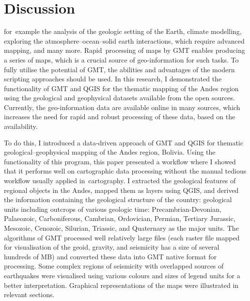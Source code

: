 \documentclass[data,article,accept,pdftex,moreauthors]{Definitions/mdpi}
\begin{document}
\section{Discussion}

 \mbox{for example} the {analysis of the} geologic setting of the Earth, climate modelling, exploring the atmosphere--ocean--solid earth interactions, {which require} advanced mapping, and many more. \linebreak \mbox{Rapid processing} of maps by GMT enables producing a series of maps, which is a crucial source of geo-information for such tasks. To fully utilise the potential of GMT, the abilities and advantages of {the} modern scripting approaches should be used. In this research, I demonstrated the functionality of GMT and QGIS for {the} thematic mapping of the Andes region {using} the geological and geophysical datasets {available from the open sources}. Currently{, the} geo-information data are available online in many sources, which increases the need for rapid and robust processing of these data, based on {the} availability. 

To do this, I introduced a data-driven approach of GMT and QGIS for thematic geological--geophysical mapping of the Andes region, Bolivia. Using the functionality of this program, this paper presented a workflow where I showed that it performs well on cartographic data processing without the manual tedious workflow usually applied \mbox{in cartography}. I extracted the geological features of regional objects in the Andes, mapped them as layers using QGIS, and derived the information containing the geological structure of the country: geological units including outcrops of various geologic time: Precambrian-Devonian, {Palaeozoic}, Carboniferous, Cambrian, Ordovician, Permian, {Tertiary} Jurassic, Mesozoic, Cenozoic, Silurian, Triassic, and Quaternary as the major units. The algorithms of GMT processed well relatively large files (each raster file mapped for visualisation of the geoid, gravity, and seismicity has a size of several hundreds of MB) and converted these data into GMT native format for processing. Some complex regions of seismicity with overlapped sources of earthquakes were visualised using various colours and sizes of legend units for a better interpretation. Graphical representations of the maps were illustrated in relevant sections. 
\end{document}
